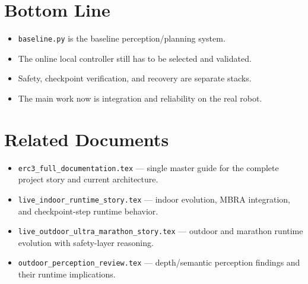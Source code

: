 \documentclass[11pt,a4paper]{article}
\begin{document}
\section{Bottom Line}

\begin{mdframed}
\begin{itemize}[nosep]
  \item \texttt{baseline.py} is the baseline perception/planning system.
  \item The online local controller still has to be selected and validated.
  \item Safety, checkpoint verification, and recovery are separate stacks.
  \item The main work now is integration and reliability on the real robot.
\end{itemize}
\end{mdframed}


\section{Related Documents}
\begin{itemize}
  \item \texttt{erc3\_full\_documentation.tex} --- single master guide for the complete project story and current architecture.
  \item \texttt{live\_indoor\_runtime\_story.tex} --- indoor evolution, MBRA integration, and checkpoint-step runtime behavior.
  \item \texttt{live\_outdoor\_ultra\_marathon\_story.tex} --- outdoor and marathon runtime evolution with safety-layer reasoning.
  \item \texttt{outdoor\_perception\_review.tex} --- depth/semantic perception findings and their runtime implications.
\end{itemize}
\end{document}
